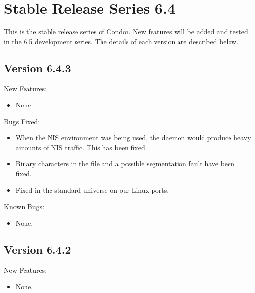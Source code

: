 \section{\label{sec:History-6-4}Stable Release Series 6.4}

This is the stable release series of Condor.
New features will be added and tested in the 6.5 development series. 
The details of each version are described below.
\subsection{\label{sec:New-6-4-3}Version 6.4.3}

\noindent New Features:
\begin{itemize}

\item None.

\end{itemize}

\noindent Bugs Fixed:
\begin{itemize}

\item When the NIS environment was being used, the  daemon
would produce heavy amounts of NIS traffic. This has been fixed.

\item Binary characters in the  file and a possible
segmentation fault have been fixed.

\item Fixed  in the standard universe on our Linux ports.

\end{itemize}

\noindent Known Bugs:
\begin{itemize}

\item None.

\end{itemize}

\subsection{\label{sec:New-6-4-2}Version 6.4.2}
\noindent New Features:
\begin{itemize}

\item None.

\end{itemize}

